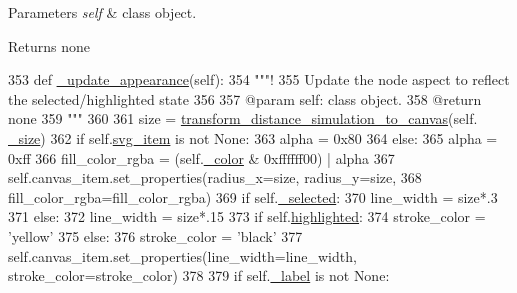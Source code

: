 \begin{DoxyParams}{Parameters}
{\em self} & class object. \\
\hline
\end{DoxyParams}
\begin{DoxyReturn}{Returns}
none 
\end{DoxyReturn}

\begin{DoxyCode}
353     \textcolor{keyword}{def }\hyperlink{classvisualizer_1_1core_1_1Node_ae5b37840dd64cdf83640f3e4e0ac7f09}{\_update\_appearance}(self):
354         \textcolor{stringliteral}{"""!}
355 \textcolor{stringliteral}{        Update the node aspect to reflect the selected/highlighted state}
356 \textcolor{stringliteral}{}
357 \textcolor{stringliteral}{        @param self: class object.}
358 \textcolor{stringliteral}{        @return none}
359 \textcolor{stringliteral}{        """}
360 
361         size = \hyperlink{namespacevisualizer_1_1base_a653f2b3d1bace2cc520f4e286e86dbb9}{transform\_distance\_simulation\_to\_canvas}(self.
      \hyperlink{classvisualizer_1_1core_1_1Node_a5fe791047714d82b5a798b72833bed40}{\_size})
362         \textcolor{keywordflow}{if} self.\hyperlink{classvisualizer_1_1core_1_1Node_a8fc37475251336b56578ff3a5d437ba3}{svg\_item} \textcolor{keywordflow}{is} \textcolor{keywordflow}{not} \textcolor{keywordtype}{None}:
363             alpha = 0x80
364         \textcolor{keywordflow}{else}:
365             alpha = 0xff
366         fill\_color\_rgba = (self.\hyperlink{classvisualizer_1_1core_1_1Node_aa6fa6cdf104826e54e8ca1358df12f24}{\_color} & 0xffffff00) | alpha
367         self.canvas\_item.set\_properties(radius\_x=size, radius\_y=size,
368                                         fill\_color\_rgba=fill\_color\_rgba)
369         \textcolor{keywordflow}{if} self.\hyperlink{classvisualizer_1_1core_1_1Node_ac2b143f96d540397a68636906e955778}{\_selected}:
370             line\_width = size*.3
371         \textcolor{keywordflow}{else}:
372             line\_width = size*.15
373         \textcolor{keywordflow}{if} self.\hyperlink{classvisualizer_1_1core_1_1Node_a4bf6c669466a274f80bb1ac72b6c067a}{highlighted}:
374             stroke\_color = \textcolor{stringliteral}{'yellow'}
375         \textcolor{keywordflow}{else}:
376             stroke\_color = \textcolor{stringliteral}{'black'}
377         self.canvas\_item.set\_properties(line\_width=line\_width, stroke\_color=stroke\_color)
378 
379         \textcolor{keywordflow}{if} self.\hyperlink{classvisualizer_1_1core_1_1Node_a660d23d39d781ab142f12f329690d018}{\_label} \textcolor{keywordflow}{is} \textcolor{keywordflow}{not} \textcolor{keywordtype}{None}:

\end{DoxyCode}
